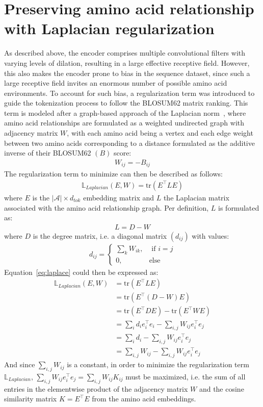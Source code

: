 \documentclass[twoside,a4paper]{master}
\begin{document}
\section{Preserving amino acid relationship with Laplacian regularization}
As described above, the encoder comprises multiple convolutional filters with varying levels of dilation, resulting in a large effective receptive field. However, this also makes the encoder prone to bias in the sequence dataset, since such a large receptive field invites an enormous number of possible amino acid environments. To account for such bias, a regularization term was introduced to guide the tokenization process to follow the BLOSUM62 matrix ranking. This term is modeled after a graph-based approach of the Laplacian norm~\cite{belkin2003laplacian}, where amino acid relationships are formulated as a weighted undirected graph with adjacency matrix \(W\), with each amino acid being a vertex and each edge weight between two amino acids corresponding to a distance formulated as the additive inverse of their BLOSUM62 \((B)\) score:
\begin{align}
    W_{ij} = -B_{ij}
\end{align}
The regularization term to minimize can then be described as follows:
\begin{align}
    \mathbb{L}_{Laplacian}(E, W) = \text{tr}(E^\intercal LE)
\label{eq:laplace}\end{align}
where \(E\) is the \(|\mathcal{A}|\times d_{tok}\) embedding matrix and \(L\) the Laplacian matrix associated with the amino acid relationship graph. Per definition, \(L\) is formulated as:
\begin{align}
    L = D - W
\end{align}
where \(D\) is the degree matrix, i.e. a diagonal matrix \((d_{ij})\) with values:
\begin{align}
    d_{ij} = \begin{cases}
        \sum_{k} W_{ik}, &\text{ if \(i = j\)}\\
        0, &\text{else}
    \end{cases}
\label{eq:diag}
\end{align}
Equation~\ref{eq:laplace} could then be expressed as:
\begin{align}
    \mathbb{L}_{Laplacian}(E,W) &= \text{tr}(E^\intercal LE)\\
    &= \text{tr}(E^\intercal (D-W)E)\\
    &= \text{tr}(E^\intercal DE) - \text{tr}(E^\intercal WE)\\
    &= \sum_i d_ie_i^\intercal e_i - \sum_{i,j} W_{ij} e_i^\intercal e_j\\
    &= \sum_i d_i - \sum_{i,j} W_{ij} e_i^\intercal e_j\\
    &= \sum_{i,j} W_{ij} - \sum_{i,j} W_{ij}e_i^\intercal e_j
\label{eq:laplace2}
\end{align}
And since \(\sum_{i,j} W_{ij}\) is a constant, in order to minimize the regularization term \(\mathbb{L}_{Laplacian}\), \(\sum_{i,j} W_{ij}e_i^\intercal e_j = \sum_{i,j} W_{ij}K_{ij}\) must be maximized, i.e. the sum of all entries in the elementwise product of the adjacency matrix \(W\) and the cosine similarity matrix \(K = E^\intercal E\) from the amino acid embeddings.
\end{document}
